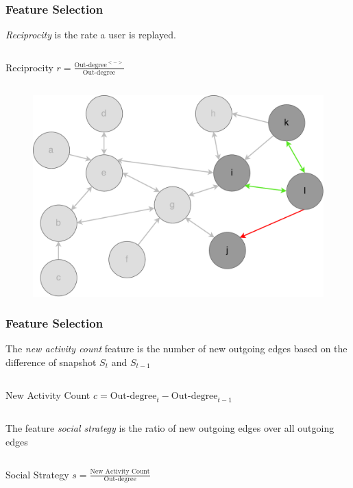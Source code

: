 \begin{frame}
\frametitle{Feature Selection}
\textit{Reciprocity} is the rate a user is replayed.
\begin{columns}\centering
\begin{column}{0.5\textwidth}
	\begin{block}{\small Reciprocity}\centering
		$r = \frac{\text{Out-degree}^{<->}}{\text{Out-degree}}$
	\end{block}
\end{column}
\end{columns}
\begin{figure}
	\includegraphics[scale=0.32]{graphics/directed_network_example_reciprocity.pdf}
\end{figure}

\end{frame}

\begin{frame}
\frametitle{Feature Selection}
The \textit{new activity count} feature is the number of new outgoing edges based on the difference of snapshot $S_t$ and $S_{t-1}$
\begin{columns}\centering
\begin{column}{0.5\textwidth}
	\begin{block}{\small New Activity Count}\centering
		$c = \text{Out-degree}_t - \text{Out-degree}_{t-1}$
	\end{block}
	\end{column}
\end{columns}

The feature \emph{social strategy} is the ratio of new outgoing edges over all outgoing edges 
\begin{columns}
\begin{column}{0.5\textwidth}
	\begin{block}{\small Social Strategy}\centering
		$s = \frac{\text{New Activity Count}}{\text{Out-degree}}$
	\end{block}
\end{column}
\end{columns}

\end{frame}

